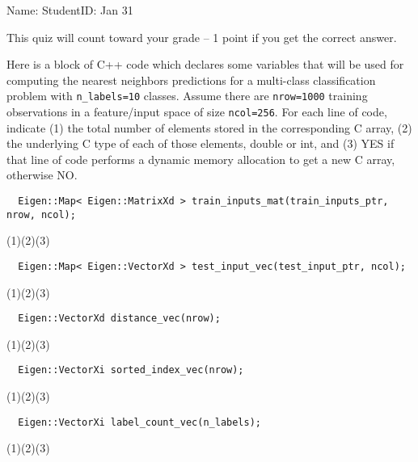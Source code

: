 \documentclass{article}
\begin{document}
\thispagestyle{empty}

Name: \underline{\hspace{2in}} StudentID: \underline{\hspace{2in}} Jan 31

This quiz will count toward your grade -- 1 point if you get the
correct answer.

Here is a block of C++ code which declares some variables that will be
used for computing the nearest neighbors predictions for a multi-class
classification problem with \verb|n_labels=10| classes. Assume there
are \verb|nrow=1000| training observations in a feature/input space of
size \verb|ncol=256|. For each line of code, indicate (1) the total
number of elements stored in the corresponding C array, (2) the
underlying C type of each of those elements, double or int, and (3)
YES if that line of code performs a dynamic memory allocation to get a
new C array, otherwise NO.
\newcommand{\oneblank}{\underline{\hspace{2in}}}
\newcommand{\blanks}{(1)\oneblank (2)\oneblank (3)\oneblank\vskip 1cm}
\begin{verbatim}
  Eigen::Map< Eigen::MatrixXd > train_inputs_mat(train_inputs_ptr, nrow, ncol);
\end{verbatim}
\blanks
\begin{verbatim}
  Eigen::Map< Eigen::VectorXd > test_input_vec(test_input_ptr, ncol);
\end{verbatim}
\blanks
\begin{verbatim}
  Eigen::VectorXd distance_vec(nrow);
\end{verbatim}
\blanks
\begin{verbatim}
  Eigen::VectorXi sorted_index_vec(nrow);
\end{verbatim}
\blanks
\begin{verbatim}
  Eigen::VectorXi label_count_vec(n_labels);
\end{verbatim}
\blanks
\end{document}
